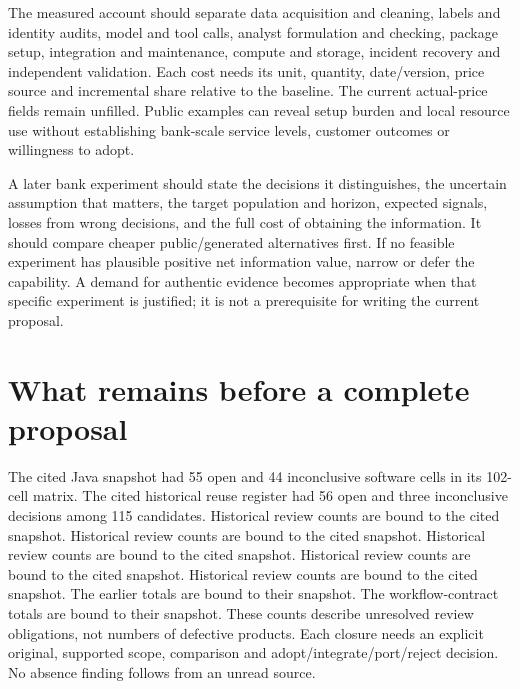 The measured account should separate data acquisition and cleaning,
labels and identity audits, model and tool calls, analyst formulation
and checking, package setup, integration and maintenance, compute and
storage, incident recovery and independent validation. Each cost needs
its unit, quantity, date/version, price source and incremental share
relative to the baseline. The current actual-price fields remain
unfilled. Public examples can reveal setup burden and local resource use
without establishing bank-scale service levels, customer outcomes or
willingness to adopt. \citep{sp13_economics}

A later bank experiment should state the decisions it distinguishes, the
uncertain assumption that matters, the target population and horizon,
expected signals, losses from wrong decisions, and the full cost of
obtaining the information. It should compare cheaper public/generated
alternatives first. If no feasible experiment has plausible positive net
information value, narrow or defer the capability. A demand for
authentic evidence becomes appropriate when that specific experiment is
justified; it is not a prerequisite for writing the current proposal.

\hypertarget{what-remains-before-a-complete-proposal}{%
\section{What remains before a complete
proposal}\label{what-remains-before-a-complete-proposal}}

The cited Java snapshot had 55 open and 44 inconclusive software cells
in its 102-cell matrix. \citep{sp24longjava_progress} The cited
historical reuse register had 56 open and three inconclusive decisions
among 115 candidates. Historical review counts are bound to the cited
snapshot. \citep{sp23tg_progress} Historical review counts are bound to
the cited snapshot. \citep{sp23panel_progress} Historical review counts
are bound to the cited snapshot. \citep{sp23otheriv_progress} Historical
review counts are bound to the cited snapshot.
\citep{sp23admission_progress} Historical review counts are bound to the
cited snapshot. \citep{sp23proof_progress} The earlier totals are bound
to their snapshot. \citep{sp24longpy_progress} The workflow-contract
totals are bound to their snapshot.
\citep{sp24workflowcontracts_progress} These counts describe unresolved
review obligations, not numbers of defective products. Each closure
needs an explicit original, supported scope, comparison and
adopt/integrate/port/reject decision. No absence finding follows from an
unread source.
\citep{sp23nt_progress,sp23lt_progress,sp23dw_progress,sp23sm_progress,sp22wf_progress,sp22ft_progress,sp22si_progress,sp22ob_progress,sp22dk_progress,sp22iv_progress,sp22bs_progress,sp21rr_progress,sp21pr_progress,sp21gs_progress,sp21eo_progress,sp21tr_progress,sp21ae_progress,sp21gr_progress,sp21ck_progress,sp21cx_progress,sp20md_progress,sp20gf_progress,sp20hy_progress,sp20je_progress,sp20nc_progress,sp20gc_progress,sp20ea_progress,sp20vm_progress,sp20pye_progress,sp20fx_progress,sp20pa_progress,sp20rfx_progress}

